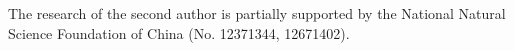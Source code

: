\documentclass{article}
\begin{document}
The research of the second author is partially supported by the National Natural Science Foundation of China (No. 12371344, 12671402).



%





\end{document}
